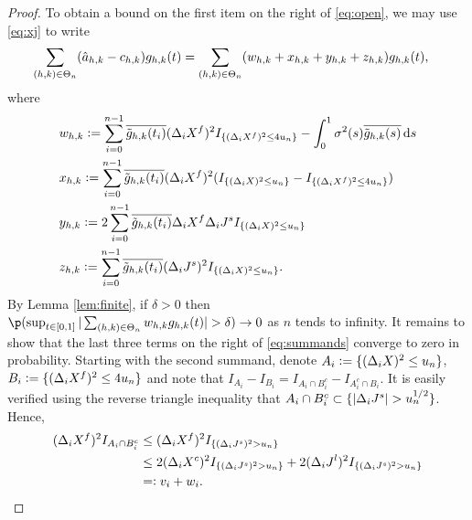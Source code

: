 \begin{proof}
     To obtain a bound on the first item on the right of \eqref{eq:open}, we may use \eqref{eq:xj} to write
    \begin{align}
      \sumt &(\ceen{X} - \cee)\ghk(t)   = \sumt (w_{h,k} + x_{h,k} + y_{h,k} + z_{h,k}) \ghk(t),\label{eq:summands} 
    \end{align}
    where 
    \begin{align}
      &w_{h,k} :=  \sumin \btghki  (\dxf)^2 \indxff - \int^{1}_{0} \sigma^2(s) \btghks \D s \notag\\
      &x_{h,k} :=  \sumin \btghki(\dxf)^2 (\indx - \indxff) \notag\\
      &y_{h,k}  := 2 \sumin \btghki\dxf \djt \indx \notag \\
      &z_{h,k} := \sumin \btghki(\djt)^2\indx.
      \label{}
    \end{align}
    By Lemma \ref{lem:finite}, if $\delta > 0$ then %
      $\p(\sup_{t \in [0,1]}\vert \sumt w_{h,k} \ghk(t) \vert > \delta) \to 0$ %
    as $n$ tends to infinity.  It remains to show that the last three terms on the right of \eqref{eq:summands} converge to zero in probability. Starting with the second summand, denote $A_i := \{(\dx)^2 \le u_n\}$,  $B_i   := \{(\dxf)^2 \le 4 u_n\}$ and note that $I_{A_i} - I_{B_i} = I_{A_i \cap B_i^c} - I_{A^c_i\cap B_i}$. It is easily verified using the  reverse triangle inequality that   $A_i \cap B_i^c \subset \{\vert \djt \vert > u_n^{1/2}\}$. Hence, 
    \begin{align}
      (\dxf)^2 I_{A_i \cap B_i^c} &\le (\dxf)^2 I_{\{(\djt)^2 > u_n\}}\\
       & \le 2 (\dxc)^2 I_{\{(\djt)^2 > u_n\}}
       + 2 (\djl)^2 I_{\{(\djt)^2 > u_n\}}\notag\\
       & =: v_i + w_i. 
      \label{eq:longineq}
    \end{align}
    \begin{comment}
    where \begin{align} &v_n :=  2c H_n \Lambda n^{-1} \log(n) \sumin I_{\{(\djt)^2 > u_n\}} \notag \\ & w_n: = c H_n \sumin  (\djl)^2 I_{\{(\djt)^2 > u_n\}}\notag \end{align}  where $c$ is a sufficiently large constant, and $\Lambda$ is a finite-valued random variable satisfying  $\Lambda \ge  \sup_{t \in \domain} \vert b(t)\vert  + C $, where $C^{1/2}$ is the finite-valued random variable from Lemma \ref{lem:mylevy}.  Let  $\delta > 0$ be given, put  $x_n(t)  :=  \sumt\left(\sumin  \btghki(\dxf)^2 I_{A_i \cap B_i^c})\right)\ghk(t)$  and note that 

\end{comment}
\end{proof}
